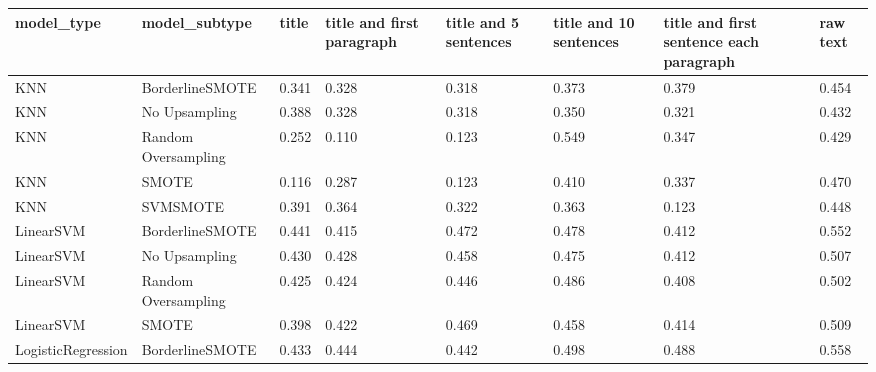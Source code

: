 \begin{tabular}{llllllll}
\toprule
                  model\_type &       model\_subtype & title & title and first paragraph & title and 5 sentences & title and 10 sentences & title and first sentence each paragraph &  raw text \\
\midrule
                         KNN &     BorderlineSMOTE & 0.341 &                     0.328 &                 0.318 &                  0.373 &                                   0.379 &     0.454 \\
                         KNN &       No Upsampling & 0.388 &                     0.328 &                 0.318 &                  0.350 &                                   0.321 &     0.432 \\
                         KNN & Random Oversampling & 0.252 &                     0.110 &                 0.123 &                  0.549 &                                   0.347 &     0.429 \\
                         KNN &               SMOTE & 0.116 &                     0.287 &                 0.123 &                  0.410 &                                   0.337 &     0.470 \\
                         KNN &            SVMSMOTE & 0.391 &                     0.364 &                 0.322 &                  0.363 &                                   0.123 &     0.448 \\
                   LinearSVM &     BorderlineSMOTE & 0.441 &                     0.415 &                 0.472 &                  0.478 &                                   0.412 &     0.552 \\
                   LinearSVM &       No Upsampling & 0.430 &                     0.428 &                 0.458 &                  0.475 &                                   0.412 &     0.507 \\
                   LinearSVM & Random Oversampling & 0.425 &                     0.424 &                 0.446 &                  0.486 &                                   0.408 &     0.502 \\
                   LinearSVM &               SMOTE & 0.398 &                     0.422 &                 0.469 &                  0.458 &                                   0.414 &     0.509 \\
          LogisticRegression &     BorderlineSMOTE & 0.433 &                     0.444 &                 0.442 &                  0.498 &                                   0.488 &     0.558 \\

\end{tabular}
